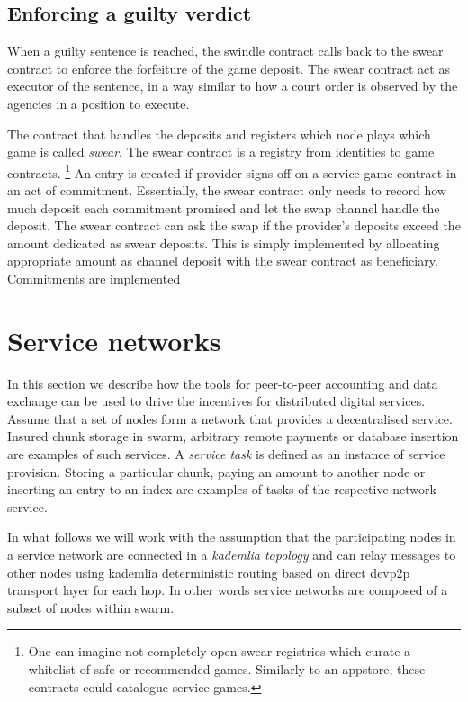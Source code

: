 \documentclass[a4paper,10pt]{article}
\newcommand\gloss[1]{\emph{\gls{#1}}}
\begin{document}
\subsection{Enforcing a guilty verdict}

When a guilty sentence is reached, the swindle contract calls back to the swear contract to enforce the forfeiture of the game deposit. The swear contract act as executor of the sentence, in a way similar to how a court order is observed by the agencies in a position to execute.  

The contract that handles the deposits and registers which node plays which game is called \gloss{swear}.
The swear contract is a registry from identities to game contracts.%
%
\footnote{One can imagine not completely open swear registries which curate a whitelist of safe or recommended games. Similarly to an appstore, these contracts could catalogue service games.}
%
An entry is created if provider signs off on a service game contract in an act of commitment. Essentially, the swear contract only needs to record how much deposit each commitment promised and let the swap channel handle the deposit.
The swear contract can  ask the swap if the provider's deposits exceed the amount dedicated as  swear deposits. This is simply implemented by allocating appropriate amount as channel deposit with the swear contract as beneficiary.
Commitments are implemented 


\section{Service networks}

In this section we describe how the tools for peer-to-peer accounting and data exchange can
be used to drive the incentives for distributed digital services.
Assume that a set of nodes form a network that provides a decentralised service.
Insured chunk storage in swarm, arbitrary remote payments or database insertion are examples of such services.
A \gloss{service task} is defined as an instance of service provision. Storing a particular chunk, paying
an amount to another node or inserting an entry to an index are examples of tasks of the respective network
service.

In what follows we will work with the assumption that the participating nodes in a service network are
connected in a \gloss{kademlia topology} and can relay messages to other nodes using kademlia deterministic routing
based on direct devp2p transport layer for each hop. In other words service networks are composed of a subset
of nodes within swarm.
\end{document}
